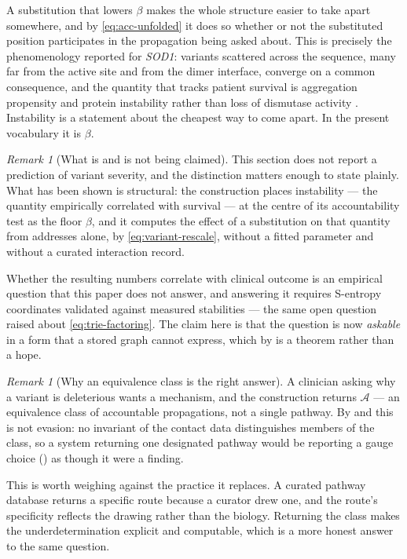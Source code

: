\documentclass[11pt,twocolumn,a4paper]{article}
\theoremstyle{thmstyle}
\theoremstyle{definition}
\theoremstyle{remark}
\newtheorem{remark}[theorem]{Remark}
\newcommand{\flo}{\beta}
\newcommand{\acc}{\mathcal{A}}
\begin{document}
A substitution that lowers $\flo$ makes the whole structure easier to
take apart somewhere, and by \eqref{eq:acc-unfolded} it does so
whether or not the substituted position participates in the propagation
being asked about. This is precisely the phenomenology reported for
\emph{SOD1}: variants scattered across the sequence, many far from the
active site and from the dimer interface, converge on a common
consequence, and the quantity that tracks patient survival is
aggregation propensity and protein instability rather than loss of
dismutase activity \citep{wang2008,prudencio2009}. Instability is a
statement about the cheapest way to come apart. In the present
vocabulary it is $\flo$.

\begin{remark}[What is and is not being claimed]
\label{rem:sod1-honest}
This section does not report a prediction of variant severity, and the
distinction matters enough to state plainly. What has been shown is
structural: the construction places instability --- the quantity
empirically correlated with survival \citep{wang2008} --- at the centre
of its accountability test as the floor $\flo$, and it computes the
effect of a substitution on that quantity from addresses alone, by
\eqref{eq:variant-rescale}, without a fitted parameter and without a
curated interaction record.

Whether the resulting numbers correlate with clinical outcome is an
empirical question that this paper does not answer, and answering it
requires S-entropy coordinates validated against measured stabilities
--- the same open question  raised about
\eqref{eq:trie-factoring}. The claim here is that the question is now
\emph{askable} in a form that a stored graph cannot express, which by
 is a theorem rather than a hope.
\end{remark}

\begin{remark}[Why an equivalence class is the right answer]
\label{rem:sod1-class}
A clinician asking why a variant is deleterious wants a mechanism, and
the construction returns $\acc$ --- an equivalence class of accountable
propagations, not a single pathway. By  and
 this is not evasion: no invariant of the
contact data distinguishes members of the class, so a system returning
one designated pathway would be reporting a gauge choice
() as though it were a finding.

This is worth weighing against the practice it replaces. A curated
pathway database returns a specific route because a curator drew one,
and the route's specificity reflects the drawing rather than the
biology. Returning the class makes the underdetermination explicit and
computable, which is a more honest answer to the same question.
\end{remark}
\end{document}
